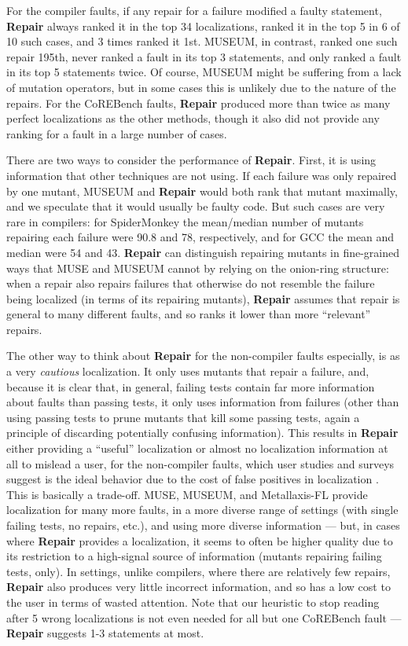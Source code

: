 For the compiler faults, if any repair for a failure modified a faulty statement, {\bf Repair} always ranked it in the top 34 localizations, ranked it in the top 5 in 6 of 10 such cases, and 3 times ranked it 1st.  MUSEUM, in contrast, ranked one such repair 195th, never ranked a fault in its top 3 statements, and only ranked a fault in its top 5 statements twice.  Of course, MUSEUM might be suffering from a lack of mutation operators, but in some cases this is unlikely due to the nature of the repairs.  For the CoREBench faults, {\bf Repair} produced more than twice as many perfect localizations as the other methods, though it also did not provide any ranking for a fault in a large number of cases.

There are two ways to consider the performance of {\bf Repair}.  First, it is using information that other techniques are not using.  If each failure was only repaired by one mutant, MUSEUM and {\bf Repair} would both rank that mutant maximally, and we speculate that it would usually be faulty code.  But such cases are very rare in compilers:  for SpiderMonkey the mean/median number of mutants repairing each failure were 90.8 and 78, respectively, and for GCC the mean and median were 54 and 43.  {\bf Repair} can distinguish repairing mutants in fine-grained ways that MUSE and MUSEUM cannot by relying on the onion-ring structure:  when a repair also repairs failures that otherwise do not resemble the failure being localized (in terms of its repairing mutants), {\bf Repair} assumes that repair is general to many different faults, and so ranks it lower than more ``relevant'' repairs.

The other way to think about {\bf Repair} for the non-compiler faults especially, is as a very \emph{cautious} localization.  It only uses mutants that repair a failure, and, because it is clear that, in general, failing tests contain far more information about faults than passing tests, it only uses information from failures (other than using passing tests to prune mutants that kill some passing tests, again a principle of discarding potentially confusing information).  This results in {\bf Repair} either providing a ``useful'' localization or almost no localization information at all to mislead a user, for the non-compiler faults, which user studies and surveys suggest is the ideal behavior due to the cost of false positives in localization \cite{AutoHelp,Kochhar}.  This is basically a trade-off.  MUSE, MUSEUM, and Metallaxis-FL provide localization for many more faults, in a more diverse range of settings (with single failing tests, no repairs, etc.), and using more diverse information --- but, in cases where {\bf Repair} provides a localization, it seems to often be higher quality due to its restriction to a high-signal source of information (mutants repairing failing tests, only).  In settings, unlike compilers, where there are relatively few repairs, {\bf Repair} also produces very little incorrect information, and so has a low cost to the user in terms of wasted attention.  Note that our heuristic to stop reading after 5 wrong localizations is not even needed for all but one CoREBench fault --- {\bf Repair} suggests 1-3 statements at most.

